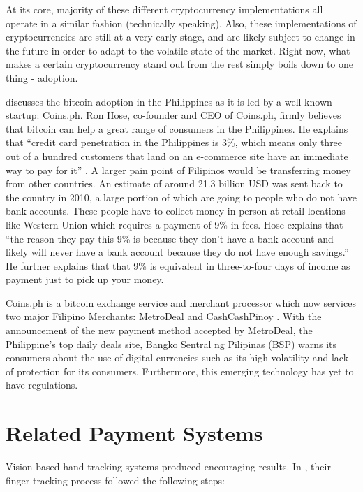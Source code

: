 \documentclass{acm_proc_article-sp}
\begin{document}
At its core, majority of these different cryptocurrency implementations all operate in a similar fashion (technically speaking). Also, these implementations of cryptocurrencies are still at a very early stage, and are likely subject to change in the future in order to adapt to the volatile state of the market. Right now, what makes a certain cryptocurrency stand out from the rest simply boils down to one thing - adoption.

\cite{Coins.ph:06292014} discusses the bitcoin adoption in the Philippines as it is led by a well-known startup: Coins.ph. Ron Hose, co-founder and CEO of Coins.ph, firmly believes that bitcoin can help a great range of consumers in the Philippines. He explains that ``credit card penetration in the Philippines is 3\%, which means only three out of a hundred customers that land on an e-commerce site have an immediate way to pay for it'' \cite{Coins.ph:06292014}. A larger pain point of Filipinos would be transferring money from other countries. An estimate of around 21.3 billion USD was sent back to the country in 2010, a large portion of which are going to people who do not have bank accounts. These people have to collect money in person at retail locations like Western Union which requires a payment of 9\% in fees. Hose explains that ``the reason they pay this 9\% is because they don't have a bank account and likely will never have a bank account because they do not have enough savings.'' He further explains that that 9\% is equivalent in three-to-four days of income as payment just to pick up your money.

Coins.ph is a bitcoin exchange service and merchant processor which now services two major Filipino Merchants: MetroDeal and CashCashPinoy \cite{Coins.ph:03202014}. With the announcement of the new payment method accepted by MetroDeal, the Philippine's top daily deals site, Bangko Sentral ng Pilipinas (BSP) warns its consumers about the use of digital currencies such as its high volatility and lack of protection for its consumers. Furthermore, this emerging technology has yet to have regulations.

\section{Related Payment Systems}
Vision-based hand tracking systems \cite{HurstWolfgangVanWezel:2013, HurstWolfgangVriens:2013} produced encouraging results. In \cite{Hardenberg:2001}, their finger tracking process followed the following steps:
\end{document}
